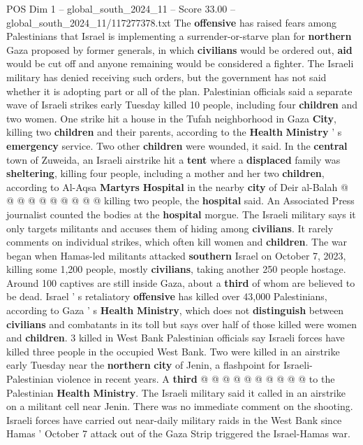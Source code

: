 \begin{textsample}{POS Dim 1 – global\_south\_2024\_11 – Score 33.00 – global\_south\_2024\_11/117277378.txt}
The \textbf{offensive} has raised fears among Palestinians that Israel is implementing a surrender-or-starve plan for \textbf{northern} Gaza proposed by former generals, in which \textbf{civilians} would be ordered out, \textbf{aid} would be cut off and anyone remaining would be considered a fighter.
The Israeli military has denied receiving such orders, but the government has not said whether it is adopting part or all of the plan.
Palestinian officials said a separate wave of Israeli strikes early Tuesday killed 10 people, including four \textbf{children} and two women.
One strike hit a house in the Tufah neighborhood in Gaza \textbf{City}, killing two \textbf{children} and their parents, according to the \textbf{Health} \textbf{Ministry} ' s \textbf{emergency} service.
Two other \textbf{children} were wounded, it said.
In the \textbf{central} town of Zuweida, an Israeli airstrike hit a \textbf{tent} where a \textbf{displaced} family was \textbf{sheltering}, killing four people, including a mother and her two \textbf{children}, according to Al-Aqsa \textbf{Martyrs} \textbf{Hospital} in the nearby \textbf{city} of Deir al-Balah @ @ @ @ @ @ @ @ @ @ killing two people, the \textbf{hospital} said.
An Associated Press journalist counted the bodies at the \textbf{hospital} morgue.
The Israeli military says it only targets militants and accuses them of hiding among \textbf{civilians}.
It rarely comments on individual strikes, which often kill women and \textbf{children}.
The war began when Hamas-led militants attacked \textbf{southern} Israel on October 7, 2023, killing some 1,200 people, mostly \textbf{civilians}, taking another 250 people hostage.
Around 100 captives are still inside Gaza, about a \textbf{third} of whom are believed to be dead.
Israel ' s retaliatory \textbf{offensive} has killed over 43,000 Palestinians, according to Gaza ' s \textbf{Health} \textbf{Ministry}, which does not \textbf{distinguish} between \textbf{civilians} and combatants in its toll but says over half of those killed were women and \textbf{children}. 3 killed in West Bank Palestinian officials say Israeli forces have killed three people in the occupied West Bank.
Two were killed in an airstrike early Tuesday near the \textbf{northern} \textbf{city} of Jenin, a flashpoint for Israeli-Palestinian violence in recent years.
A \textbf{third} @ @ @ @ @ @ @ @ @ @ to the Palestinian \textbf{Health} \textbf{Ministry}.
The Israeli military said it called in an airstrike on a militant cell near Jenin.
There was no immediate comment on the shooting.
Israeli forces have carried out near-daily military raids in the West Bank since Hamas ' October 7 attack out of the Gaza Strip triggered the Israel-Hamas war.

\end{textsample}
